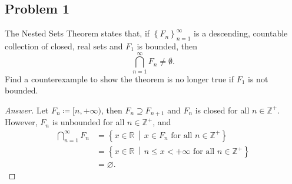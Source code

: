 \documentclass[12pt]{article}
\newcommand{\z}{\mathbb{Z}}
\newcommand{\real}{\mathbb{R}}
\newcommand\setb[1]{\left \{ #1 \right \}}
\theoremstyle{definition}
\begin{document}
\subsection{Problem 1}
The Nested Sets Theorem states that, if $\setb{ F_n }_{n = 1}^{\infty}$ is a descending, countable collection of closed, real sets and $F_1$ is bounded, then 
\[
    \bigcap\limits_{n = 1}^{\infty} F_n \neq \emptyset. 
\]
Find a counterexample to show the theorem is no longer true if $F_1$ is not bounded. 
\begin{proof}[Answer]
    Let $F_n \coloneqq [n,+\infty)$, then $F_n \supseteq F_{n+1}$ and $F_n$ is closed for all $n \in \z^+$. However, $F_n$ is unbounded for all $n \in \z^+$, and 
    \begin{align*}
        \bigcap\limits_{n = 1}^{\infty} F_n & = \setb{ x \in \real \, \middle| \, x \in F_n \text{ for all } n \in \z^+ } \\ 
        & = \setb{ x \in \real \, \middle| \, n \leq x < +\infty \text{ for all } n \in \z^+ } \\ 
        & = \varnothing . 
    \end{align*}
\end{proof}
\end{document}
